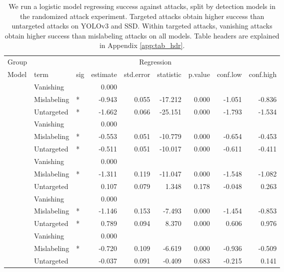 \documentclass[
]{article}
\begin{document}
\begingroup\fontsize{9}{11}\selectfont

\begin{longtable}[t]{lllrrrrrr}
\caption{\label{tab:target_untarget_vanish_mislabel_table}We run a logistic model regressing success against attacks, split by detection models in the randomized attack experiment. Targeted attacks obtain higher success than untargeted attacks on YOLOv3 and SSD. Within targeted attacks, vanishing attacks obtain higher success than mislabeling attacks on all models. Table headers are explained in Appendix \ref{app:tab_hdr}.}\\
\toprule
\multicolumn{1}{c}{Group} & \multicolumn{8}{c}{Regression} \\
\cmidrule(l{3pt}r{3pt}){1-1} \cmidrule(l{3pt}r{3pt}){2-9}
Model & term & sig & estimate & std.error & statistic & p.value & conf.low & conf.high\\
\midrule
 & Vanishing &  & 0.000 &  &  &  &  & \\
\cmidrule{2-9}\nopagebreak
 & Mislabeling & * & -0.943 & 0.055 & -17.212 & 0.000 & -1.051 & -0.836\\
\cmidrule{2-9}\nopagebreak
\multirow{-3}{*}{\raggedright\arraybackslash YOLOv3} & Untargeted & * & -1.662 & 0.066 & -25.151 & 0.000 & -1.793 & -1.534\\
\cmidrule{1-9}\pagebreak[0]
 & Vanishing &  & 0.000 &  &  &  &  & \\
\cmidrule{2-9}\nopagebreak
 & Mislabeling & * & -0.553 & 0.051 & -10.779 & 0.000 & -0.654 & -0.453\\
\cmidrule{2-9}\nopagebreak
\multirow{-3}{*}{\raggedright\arraybackslash SSD} & Untargeted & * & -0.511 & 0.051 & -10.017 & 0.000 & -0.611 & -0.411\\
\cmidrule{1-9}\pagebreak[0]
 & Vanishing &  & 0.000 &  &  &  &  & \\
\cmidrule{2-9}\nopagebreak
 & Mislabeling & * & -1.311 & 0.119 & -11.047 & 0.000 & -1.548 & -1.082\\
\cmidrule{2-9}\nopagebreak
\multirow{-3}{*}{\raggedright\arraybackslash RetinaNet} & Untargeted &  & 0.107 & 0.079 & 1.348 & 0.178 & -0.048 & 0.263\\
\cmidrule{1-9}\pagebreak[0]
 & Vanishing &  & 0.000 &  &  &  &  & \\
\cmidrule{2-9}\nopagebreak
 & Mislabeling & * & -1.146 & 0.153 & -7.493 & 0.000 & -1.454 & -0.853\\
\cmidrule{2-9}\nopagebreak
\multirow{-3}{*}{\raggedright\arraybackslash Faster R-CNN} & Untargeted & * & 0.789 & 0.094 & 8.370 & 0.000 & 0.606 & 0.976\\
\cmidrule{1-9}\pagebreak[0]
 & Vanishing &  & 0.000 &  &  &  &  & \\
\cmidrule{2-9}\nopagebreak
 & Mislabeling & * & -0.720 & 0.109 & -6.619 & 0.000 & -0.936 & -0.509\\
\cmidrule{2-9}\nopagebreak
\multirow{-3}{*}{\raggedright\arraybackslash Cascade R-CNN} & Untargeted &  & -0.037 & 0.091 & -0.409 & 0.683 & -0.215 & 0.141\\
\bottomrule
\end{longtable}
\endgroup{}
\end{document}
